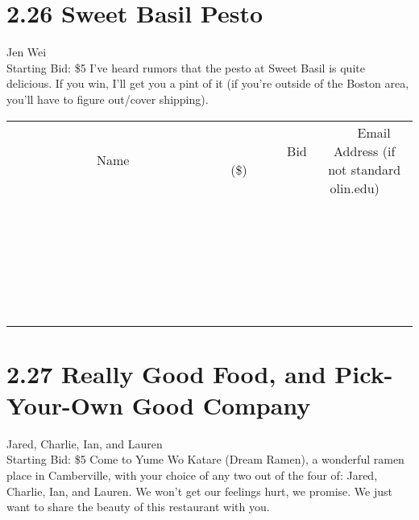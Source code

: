 \documentclass[11pt]{article}
\begin{document}
\section*{2.26 Sweet Basil Pesto}
Jen Wei
\\
Starting Bid: \$5
\newline
I've heard rumors that the pesto at Sweet Basil is quite delicious. If you win, I'll get you a pint of it (if you're outside of the Boston area, you'll have to figure out/cover shipping).
\\[6ex]
\begin{tabular}{c c c}
~~~~~~~~~~~~~Name~~~~~~~~~~~~~ & ~~~~~~~~~Bid (\$)~~~~~~~~~  & ~~~Email Address (if not standard olin.edu)~~~\\
 & & \\
\hline
 & & \\
\hline
 & & \\
\hline
 & & \\
\hline
 & & \\
\hline
 & & \\
\hline
 & & \\
\hline
 & & \\
\hline
 & & \\
\hline
 & & \\
\hline
 & & \\
\hline
 & & \\
\hline
 & & \\
\hline
 & & \\
\hline
 & & \\
\hline
 & & \\
\hline
 & & \\
\hline
 & & \\
\hline
 & & \\
\hline
 & & \\
\hline
 & & \\
\hline
 & & \\
\hline
 & & \\
\hline
 & & \\
\hline
 & & \\
\hline
 & & \\
\hline
\end{tabular}
\newpage
\section*{2.27 Really Good Food, and Pick-Your-Own Good Company}
Jared, Charlie, Ian, and Lauren
\\
Starting Bid: \$5
\newline
Come to Yume Wo Katare (Dream Ramen), a wonderful ramen place in Camberville, with your choice of any two out of the four of: Jared, Charlie, Ian, and Lauren. We won't get our feelings hurt, we promise. We just want to share the beauty of this restaurant with you. 
\end{document}
